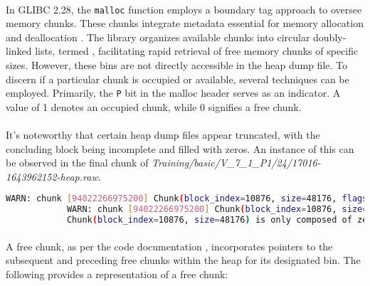         \paragraph{}In GLIBC 2.28, the \texttt{malloc} function employs a boundary tag approach to oversee memory \glspl{chunk}. These \glspl{chunk} integrate metadata essential for memory allocation and deallocation \cite{gloger_malloc_2001} \cite{delorie_malloc_2023}. The library organizes available \glspl{chunk} into circular doubly-linked lists, termed , facilitating rapid retrieval of free memory \glspl{chunk} of specific sizes. However, these bins are not directly accessible in the heap dump file. To discern if a particular \gls{chunk} is occupied or available, several techniques can be employed. Primarily, the \texttt{P} bit in the malloc header serves as an indicator. A value of 1 denotes an occupied \gls{chunk}, while 0 signifies a free \gls{chunk}.

        \paragraph{}It's noteworthy that certain heap dump files appear truncated, with the concluding block being incomplete and filled with zeros. An instance of this can be observed in the final \gls{chunk} of \textit{Training/basic/V\_7\_1\_P1/24/17016-1643962152-heap.raw}.

        \begin{lstlisting}[language=bash, caption={Logs from \gls{chunk} exploration script, highlighting the last \gls{chunk} of the file \textit{Training/basic/V\_7\_1\_P1/24/17016-1643962152-heap.raw}. }]
            WARN: chunk [94022266975200] Chunk(block_index=10876, size=48176, flags=[A=False, M=False, P=True]) is out of bounds. Last block index: 16895 Iteration index: 16896 
            WARN: chunk [94022266975200] Chunk(block_index=10876, size=48176, flags=[A=False, M=False, P=True]) is out of bounds. Last block index: 16895 Iteration index: 16897
            Chunk(block_index=10876, size=48176) is only composed of zeros.
        \end{lstlisting}

        \paragraph{}A free \gls{chunk}, as per the code documentation \cite{gloger_malloc_2001}, incorporates pointers to the subsequent and preceding free \glspl{chunk} within the heap for its designated bin. The following provides a representation of a free \gls{chunk}:

